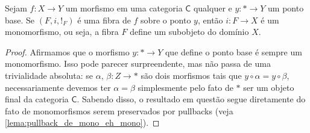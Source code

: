 \begin{lema}\label{lema:fibra_define_subobjeto}
  Sejam $f: X \to Y$ um morfismo em uma categoria $\mathsf{C}$ qualquer e $y: * \to Y$ um ponto base.
  Se $(F,i,!_{F})$ é uma fibra de $f$ sobre o ponto $y$, então $i: F \to X$ é um monomorfismo, ou seja, a fibra $F$ define um subobjeto do domínio $X$.
\end{lema}

\begin{proof}
  Afirmamos que o morfismo $y: * \to Y$ que define o ponto base é sempre um monomorfismo.
  Isso pode parecer surpreendente, mas não passa de uma trivialidade absoluta: se $\alpha,\, \beta: Z \to *$ são dois morfismos tais que $y \circ \alpha = y \circ \beta$, necessariamente devemos ter $\alpha = \beta$ simplesmente pelo fato de $*$ ser um objeto final da categoria $\mathsf{C}$.
  Sabendo disso, o resultado em questão segue diretamente do fato de monomorfismos serem preservados por pullbacks (veja \cref{lema:pullback_de_mono_eh_mono}).
\end{proof}

